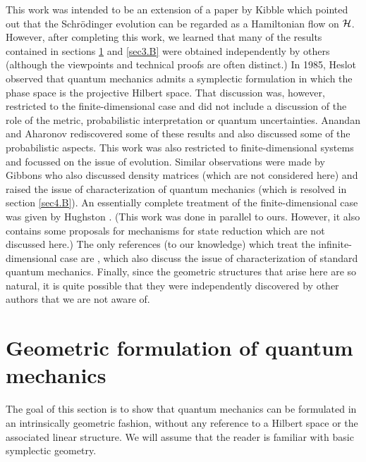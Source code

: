 \documentclass[12pt,aps,eqsecnum,tighten]{revtex4-2}
\def\H{{\cal H}}
\begin{document}
This work was intended to be an extension of a paper by Kibble
{}\cite{kibble} which pointed out that the Schr\"odinger evolution can
be regarded as a Hamiltonian flow on $\H$. However, after completing
this work, we learned that many of the results contained in sections
\ref{sec2} and \ref{sec3.B} were obtained independently by others
(although the viewpoints and technical proofs are often distinct.)  In
1985, Heslot \cite{heslot} observed that quantum mechanics admits a
symplectic formulation in which the phase space is the projective
Hilbert space. That discussion was, however, restricted to the
finite-dimensional case and did not include a discussion of the role
of the metric, probabilistic interpretation or quantum uncertainties.
Anandan and Aharonov \cite{anandan} rediscovered some of these results
and also discussed some of the probabilistic aspects. This work was
also restricted to finite-dimensional systems and focussed on the
issue of evolution. Similar observations were made by Gibbons
\cite{gibbons} who also discussed density matrices (which are not
considered here) and raised the issue of characterization of quantum
mechanics (which is resolved in section \ref{sec4.B}). An essentially
complete treatment of the finite-dimensional case was given by
Hughston \cite{hughston}. (This work was done in parallel to
ours. However, it also contains some proposals for mechanisms for
state reduction \cite{hughston2} which are not discussed here.)  The
only references (to our knowledge) which treat the
infinite-dimensional case are \cite{italy1,italy2}, which also discuss
the issue of characterization of standard quantum mechanics. Finally,
since the geometric structures that arise here are so natural, it is
quite possible that they were independently discovered by other
authors that we are not aware of.


\section{Geometric formulation of quantum mechanics}\label{sec2}

The goal of this section is to show that quantum mechanics can be
formulated in an intrinsically geometric fashion, without any
reference to a Hilbert space or the associated linear structure.  We
will assume that the reader is familiar with basic symplectic
geometry.

\end{document}
